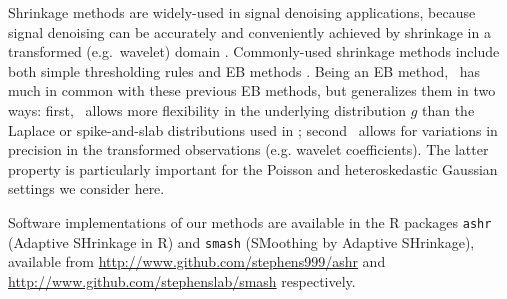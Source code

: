 \documentclass[12pt]{article}
\begin{document}
Shrinkage methods are widely-used in signal denoising applications, because signal denoising can be accurately and conveniently achieved by shrinkage in a transformed (e.g.~wavelet) domain \cite{Donoho1994Ideal}. 
Commonly-used shrinkage methods include both
simple thresholding rules \cite{Coifman1995Translationinvariant, Donoho1994Ideal, donoho95} and EB methods \cite{Johnstone2005Empirical, Clyde2000Flexible}.
Being an EB method, \ash~has much in common with these previous EB methods, but generalizes them in two ways: first, 
\ash~allows more flexibility in the underlying distribution $g$ than the Laplace or spike-and-slab
distributions used in \cite{Johnstone2005Empirical, Clyde2000Flexible}; second \ash~allows for variations in precision in the transformed observations (e.g. wavelet coefficients). The latter property is particularly important for
the Poisson and heteroskedastic Gaussian settings we consider here.

Software implementations of our methods are available in the R packages {\tt ashr} (Adaptive SHrinkage in R)
and {\tt smash} (SMoothing by Adaptive SHrinkage), available from 
\url{http://www.github.com/stephens999/ashr} and \url{http://www.github.com/stephenslab/smash} respectively. 



\end{document}

